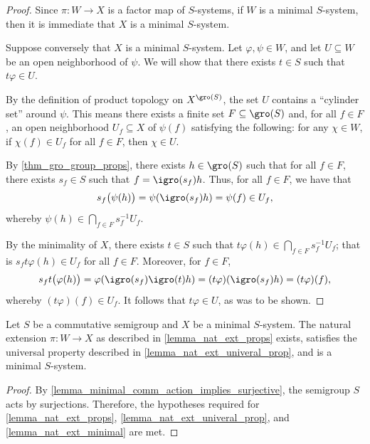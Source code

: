 \begin{proof}
    Since $\pi: W \to X$ is a factor map of $S$-systems, if $W$ is a minimal $S$-system, then it is immediate that $X$ is a minimal $S$-system.

    Suppose conversely that $X$ is a minimal $S$-system. Let $\varphi, \psi \in W$, and let $U \subseteq W$ be an open neighborhood of $\psi$. We will show that there exists $t \in S$ such that $t \varphi \in U$.
    
    By the definition of product topology on $X^{\gro(S)}$, the set $U$ contains a ``cylinder set'' around $\psi$. This means there exists a finite set $F \subseteq \gro(S)$ and, for all $f \in F$, an open neighborhood $U_f \subseteq X$ of $\psi(f)$ satisfying the following: for any $\chi \in W$, if $\chi(f) \in U_f$ for all $f \in F$, then $\chi \in U$.

    By \cref{thm_gro_group_props}, there exists $h \in \gro(S)$ such that for all $f \in F$, there exists $s_f \in S$ such that $f = \igro(s_f) h$.  Thus, for all $f \in F$, we have that
    \[s_f \big(\psi (h)\big) = \psi( \igro(s_f) h) = \psi (f) \in U_f,\]
    whereby $\psi(h) \in \bigcap_{f \in F} s_f^{-1} U_f$.

    By the minimality of $X$, there exists $t \in S$ such that $t\varphi(h) \in \bigcap_{f \in F} s_f^{-1} U_f$; that is $s_f t \varphi(h) \in U_f$ for all $f \in F$. Moreover, for $f \in F$,
    \[
        s_f t \big(\varphi(h)\big) = \varphi( \igro(s_f) \igro(t) h) = (t \varphi) (\igro(s_f) h) = (t \varphi) (f),
    \]
    whereby $(t \varphi) (f) \in U_f$.  It follows that $t \varphi \in U$, as was to be shown.
\end{proof}

\begin{corollary}
\label{cor_nat_ext_for_min_comm_act}
    Let $S$ be a commutative semigroup and $X$ be a minimal $S$-system.  The natural extension $\pi: W \to X$ as described in \cref{lemma_nat_ext_props} exists, satisfies the universal property described in \cref{lemma_nat_ext_univeral_prop}, and is a minimal $S$-system.
\end{corollary}

\begin{proof}
    By \cref{lemma_minimal_comm_action_implies_surjective}, the semigroup $S$ acts by surjections.  Therefore, the hypotheses required for \cref{lemma_nat_ext_props}, \cref{lemma_nat_ext_univeral_prop}, and \cref{lemma_nat_ext_minimal} are met.
\end{proof}

